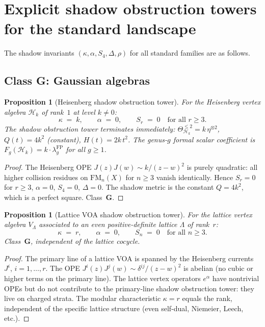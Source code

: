 \documentclass[11pt]{article}
\theoremstyle{plain}
\newtheorem{proposition}[theorem]{Proposition}
\theoremstyle{definition}
\theoremstyle{remark}
\newcommand{\FM}{\mathrm{FM}}
\newcommand{\cH}{\mathcal{H}}
\begin{document}

\section{Explicit shadow obstruction towers for the standard landscape}
\label{sec:landscape}

The shadow invariants $(\kappa, \alpha, S_4,
\Delta, \rho)$ for all standard families are as follows.

\subsection{Class G: Gaussian algebras}
\label{subsec:class-G}

\begin{proposition}[Heisenberg shadow obstruction tower]
\label{prop:heisenberg-shadow}
For the Heisenberg vertex algebra $\cH_k$ of rank~$1$
at level $k \neq 0$:
\[
 \kappa \;=\; k,
 \qquad
 \alpha \;=\; 0,
 \qquad
 S_r \;=\; 0 \quad\text{for all } r \geq 3.
\]
The shadow obstruction tower terminates immediately:
$\Theta_{\cH_k}^{\leq 2} = k\,\eta^{\otimes 2}$,
$Q(t) = 4k^2$ \textup{(}constant\textup{)}, $H(t) = 2k\,t^2$.
The genus-$g$ formal scalar coefficient is $F_g(\cH_k) = k \cdot
\lambda_g^{\mathrm{FP}}$ for all $g \geq 1$.
\end{proposition}

\begin{proof}
The Heisenberg OPE $J(z)J(w) \sim k/(z-w)^2$ is purely
quadratic: all higher collision residues on $\FM_n(X)$
for $n \geq 3$ vanish identically. Hence $S_r = 0$ for
$r \geq 3$, $\alpha = 0$, $S_4 = 0$, $\Delta = 0$.
The shadow metric is the constant $Q = 4k^2$, which
is a perfect square. Class~$\mathbf{G}$.
\end{proof}

\begin{proposition}[Lattice VOA shadow obstruction tower]
\label{prop:lattice-shadow}
For the lattice vertex algebra $V_\Lambda$ associated to
an even positive-definite lattice $\Lambda$ of rank~$r$:
\[
 \kappa \;=\; r,
 \qquad
 \alpha \;=\; 0,
 \qquad
 S_n \;=\; 0 \quad\text{for all } n \geq 3.
\]
Class~$\mathbf{G}$, independent of the lattice cocycle.
\end{proposition}

\begin{proof}
The primary line of a lattice VOA is spanned by the
Heisenberg currents $J^i$, $i = 1, \ldots, r$.
The OPE $J^i(z)J^j(w) \sim \delta^{ij}/(z-w)^2$
is abelian (no cubic or higher terms on the primary
line). The lattice vertex operators $e^\alpha$ have
nontrivial OPEs but do not contribute to the primary-line
shadow obstruction tower: they live on charged strata. The
modular characteristic $\kappa = r$ equals the
rank, independent of the specific lattice structure
(even self-dual, Niemeier, Leech, etc.).
\end{proof}
\end{document}
